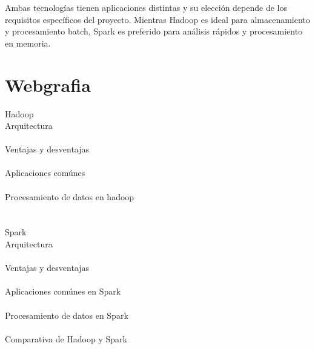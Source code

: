 \documentclass[12pt]{article}
\begin{document}
Ambas tecnologías tienen aplicaciones distintas y su elección depende de los requisitos específicos del proyecto. 
Mientras Hadoop es ideal para almacenamiento y procesamiento batch, Spark es preferido para análisis rápidos y procesamiento en memoria.

\clearpage

\section{Webgrafia}


Hadoop
\\
Arquitectura
\\
\cite{aprenderbigdata-hadoop}
\cite{ionos-hadoop}
\\
Ventajas y desventajas
\\
\cite{hostzealot-hadoop}
\cite{jacagudelo-hadoop}
\\
Aplicaciones comúnes
\\
\cite{powerdata-hadoop}
\\
Procesamiento de datos en hadoop
\\
\cite{deusto-hadoop}
\\
\\
Spark
\\
Arquitectura
\\
\cite{keepcoding-spark}
\cite{medium-spark}
\\
Ventajas y desventajas
\\
\cite{bbvaapimarket-spark}
\cite{ionos-spark}
\\
Aplicaciones comúnes en Spark
\\
\cite{googleCloud-spark}
\\
Procesamiento de datos en Spark
\\
\cite{diegocalvo-spark}
\\

Comparativa de Hadoop y Spark
\\
\cite{aws-hadoop-spark}
\cite{esic-hadoop-spark}
\cite{inesdi-hadoop-spark}
\cite{hadoop-spark}

\printbibliography
\end{document}
